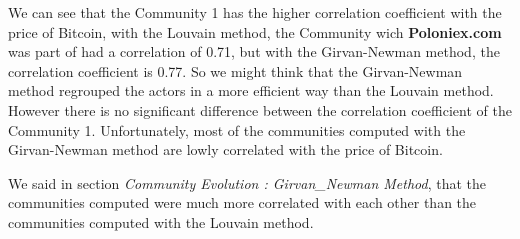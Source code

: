 \documentclass[a4paper, 12pt]{article}
\begin{document}
\begin{table}[!h]
    \begin{minipage}{0.35\linewidth}
        \centering
        \label{tab:louvain_correlation_matrix_btc}
        \caption{Correlation BTC / Community}
    \end{minipage}%
    \hspace{0.05\linewidth} %
    \begin{minipage}{0.60\linewidth}
        We can see that the Community 1 has the higher correlation coefficient with the price of Bitcoin, 
        with the Louvain method, the Community wich \textbf{Poloniex.com} was part of had a correlation
        of 0.71, but with the Girvan-Newman method, the correlation coefficient is 0.77. 
        So we might think that the Girvan-Newman method regrouped the actors in a more efficient way than the Louvain method. \\
        However there is no significant difference between the correlation coefficient of the Community 1.
        Unfortunately, most of the communities computed with the Girvan-Newman method are lowly correlated with the price of Bitcoin.
    \end{minipage}
\end{table}

We said in section \textit{Community Evolution : Girvan\_Newman Method}, that the communities computed were much more
correlated with each other than the communities computed with the Louvain method.
\end{document}

